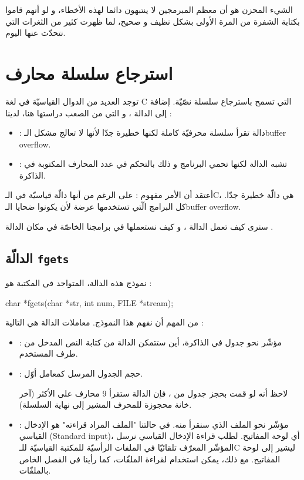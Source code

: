 الشيء المحزن هو أن معظم المبرمجين لا ينتبهون دائما لهذه الأخطاء، و لو أنهم قاموا بكتابة الشفرة من المرة الأولى بشكل نظيف و صحيح، لما ظهرت كثير من الثغرات التي نتحدّث عنها اليوم.

\section{استرجاع سلسلة محارف}

توجد العديد من الدوال القياسيّة في لغة
\textenglish{C}
التي تسمح باسترجاع سلسلة نصّيّة. إضافة إلى الدالة
،
و التي من الصعب دراستها هنا، لدينا :

\begin{itemize}
  \item {}:
دالة تقرأ سلسلة محرفيّة كاملة لكنها خطيرة جدّا لأنها لا تعالج مشكل الـ\textenglish{buffer overflow}.
  \item {} :
 تشبه الدالة
لكنها تحمي البرنامج و ذلك بالتحكم في عدد المحارف المكتوبة في الذاكرة.
\end{itemize}

أعتقد أن الأمر مفهوم : على الرغم من أنها دالّة قياسيّة في الـ\textenglish{C}،
هي دالّة خطيرة  جدّا. كل البرامج الّتي تستخدمها عرضة لأن يكونوا ضحايا الـ\textenglish{buffer overflow}.

سنرى كيف تعمل الدالة
،
و كيف نستعملها في برامجنا الخاصّة في مكان الدالة
.

\subsection{الدالّة \texttt{fgets}}

نموذج هذه الدالة، المتواجد في المكتبة
هو :

\begin{Csource}
char *fgets(char *str, int num, FILE *stream);
\end{Csource}

من المهم أن نفهم هذا النموذج. معاملات الدالة هي التالية :

\begin{itemize}
  \item {} :
مؤشّر نحو جدول في الذاكرة، أين ستتمكن الدالة من كتابة النص المدخل من طرف المستخدم.
  \item {} :
حجم الجدول
المرسل كمعامل أوّل.

لاحظ أنه لو قمت بحجز جدول من
،
فإن الدالة
ستقرأ 9 محارف على الأكثر (آخر خانة محجوزة للمحرف
المشير إلى نهاية السلسلة).
  \item {} :
مؤشّر نحو الملف الذي سنقرأ منه. في حالتنا "الملف المراد قراءته" هو الإدخال القياسي
(\textenglish{Standard input})،
أي لوحة المفاتيح. لطلب قراءة الإدخال القياسي نرسل المؤشّر
المعرّف تلقائيّا في الملفات الرأسيّة للمكتبة القياسيّة للـ\textenglish{C}
ليشير إلى لوحة المفاتيح. مع ذلك، يمكن استخدام
لقراءة الملفّات، كما رأينا في الفصل الخاص بالملفّات.
\end{itemize}

